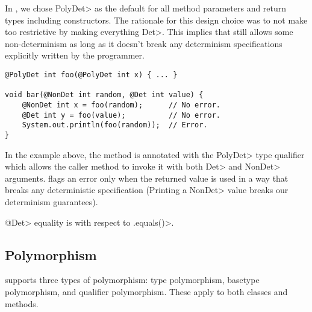 In \theDeterminismChecker, we chose \<PolyDet> as the default for all 
method parameters and return types including constructors.
The rationale for this design choice was to not make \theDeterminismChecker too restrictive by making everything \<Det>.  This implies that
\theDeterminismChecker still allows some non-determinism as long as it doesn't break any determinism specifications explicitly written by the programmer.

\begin{verbatim}
@PolyDet int foo(@PolyDet int x) { ... }

void bar(@NonDet int random, @Det int value) {
    @NonDet int x = foo(random);      // No error.
    @Det int y = foo(value);          // No error.
    System.out.println(foo(random));  // Error.
}
\end{verbatim}
In the example above, the method  is annotated with the \<PolyDet> type qualifier which allows
the caller method  to invoke it with both \<Det> and \<NonDet> arguments. \TheDeterminismChecker flags an error 
only when the returned value is used in a way that breaks any deterministic specification (Printing a \<NonDet> value
breaks our determinism guarantees).


\<@Det> equality is with respect to \<.equals()>.


\subsection{Polymorphism}\label{java-polymorphism}

\OurTypeSystem supports three types of polymorphism:  type
polymorphism, basetype polymorphism, and qualifier polymorphism.
These apply to both classes and methods.

